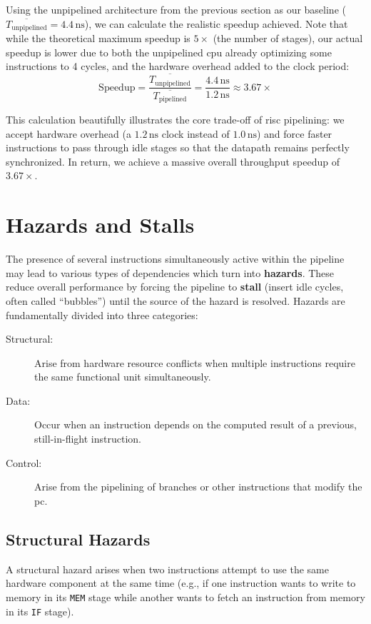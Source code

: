 \noindent Using the unpipelined architecture from the previous section as our baseline (\(\overline{T_{\text{unpipelined}}} = 4.4\,\text{ns}\)), we can calculate the realistic speedup achieved. Note that while the theoretical maximum speedup is \(5\times\) (the number of stages), our actual speedup is lower due to both the unpipelined \gls{cpu} already optimizing some instructions to 4 cycles, and the hardware overhead added to the clock period:
\[
    \text{Speedup} = \frac{\overline{T_{\text{unpipelined}}}}{\overline{T_{\text{pipelined}}}} = \frac{4.4\,\text{ns}}{1.2\,\text{ns}} \approx \mathbf{3.67\times}
\]

\noindent This calculation beautifully illustrates the core trade-off of \gls{risc} pipelining: we accept hardware overhead (a \(1.2\,\text{ns}\) clock instead of \(1.0\,\text{ns}\)) and force faster instructions to pass through idle stages so that the datapath remains perfectly synchronized. In return, we achieve a massive overall throughput speedup of \(3.67\times\).

\section{Hazards and Stalls}
\label{sec:hazards}
The presence of several instructions simultaneously active within the pipeline may lead to various types of dependencies which turn into \textbf{hazards}. These reduce overall performance by forcing the pipeline to \textbf{stall} (insert idle cycles, often called ``bubbles'') until the source of the hazard is resolved. Hazards are fundamentally divided into three categories:
\begin{description}
    \item[Structural:] Arise from hardware resource conflicts when multiple instructions require the same functional unit simultaneously.
    \item[Data:] Occur when an instruction depends on the computed result of a previous, still-in-flight instruction.
    \item[Control:] Arise from the pipelining of branches or other instructions that modify the \gls{pc}.
\end{description}

\subsection{Structural Hazards}
A structural hazard arises when two instructions attempt to use the same hardware component at the same time (e.g., if one instruction wants to write to memory in its \texttt{MEM} stage while another wants to fetch an instruction from memory in its \texttt{IF} stage). 

